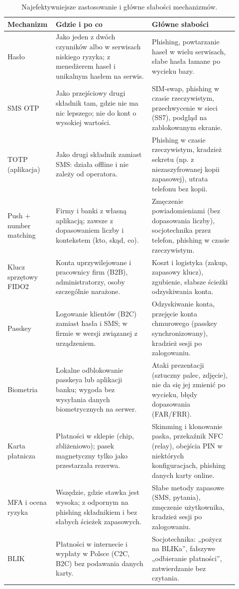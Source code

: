 \begingroup\small
\begin{longtable}{@{}p{0.16\linewidth} p{0.4\linewidth} p{0.36\linewidth}@{}}
\caption{Najefektywniejsze zastosowanie i główne słabości mechanizmów.}\label{tab:zastosowanie}\\
\toprule
Mechanizm & Gdzie i po co & Główne słabości \\
\midrule
\endhead
Hasło & Jako jeden z dwóch czynników albo w serwisach niskiego ryzyka; z menedżerem haseł i unikalnym hasłem na serwis. & Phishing, powtarzanie haseł w wielu serwisach, słabe hasła łamane po wycieku bazy. \\
SMS OTP & Jako przejściowy drugi składnik tam, gdzie nie ma nic lepszego; nie do kont o wysokiej wartości. & SIM-swap, phishing w czasie rzeczywistym, przechwycenie w sieci (SS7), podgląd na zablokowanym ekranie. \\
TOTP (aplikacja) & Jako drugi składnik zamiast SMS: działa offline i nie zależy od operatora. & Phishing w czasie rzeczywistym, kradzież sekretu (np. z niezaszyfrowanej kopii zapasowej), utrata telefonu bez kopii. \\
Push + number matching & Firmy i banki z własną aplikacją; zawsze z dopasowaniem liczby i kontekstem (kto, skąd, co). & Zmęczenie powiadomieniami (bez dopasowania liczby), socjotechnika przez telefon, phishing w czasie rzeczywistym. \\
Klucz sprzętowy FIDO2 & Konta uprzywilejowane i pracownicy firm (B2B), administratorzy, osoby szczególnie narażone. & Koszt i logistyka (zakup, zapasowy klucz), zgubienie, słabsze ścieżki odzyskiwania konta. \\
Passkey & Logowanie klientów (B2C) zamiast hasła i SMS; w firmie w wersji związanej z urządzeniem. & Odzyskiwanie konta, przejęcie konta chmurowego (passkey synchronizowany), kradzież sesji po zalogowaniu. \\
Biometria & Lokalne odblokowanie passkeya lub aplikacji banku; wygoda bez wysyłania danych biometrycznych na serwer. & Ataki prezentacji (sztuczny palec, zdjęcie), nie da się jej zmienić po wycieku, błędy dopasowania (FAR/FRR). \\
Karta płatnicza & Płatności w sklepie (chip, zbliżeniowo); pasek magnetyczny tylko jako przestarzała rezerwa. & Skimming i klonowanie paska, przekaźnik NFC (relay), obejścia PIN w niektórych konfiguracjach, phishing danych karty online. \\
MFA i ocena ryzyka & Wszędzie, gdzie stawka jest wysoka; z odpornym na phishing składnikiem i bez słabych ścieżek zapasowych. & Słabe metody zapasowe (SMS, pytania), zmęczenie użytkownika, kradzież sesji po zalogowaniu. \\
BLIK & Płatności w internecie i wypłaty w Polsce (C2C, B2C) bez podawania danych karty. & Socjotechnika: „pożycz na BLIKa”, fałszywe „odbieranie płatności”, zatwierdzanie bez czytania. \\
\bottomrule
\end{longtable}
\endgroup
